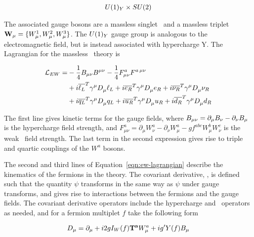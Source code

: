 \begin{align}
U(1)_{Y} \times SU(2) 
\end{align}

The associated gauge bosons are a massless singlet \Bmu\ and a massless triplet
$\mathbf{W_{\mu}} = \{W^{1}_{\mu}, W^{2}_{\mu}, W^{3}_{\mu}\}$. The $U(1)_{Y}$ gauge group is analogous to the
electromagnetic field, but is instead associated with hypercharge Y.
The Lagrangian for the massless \ew\ theory is

\begin{align}
\mathcal{L}_{EW}  = & - \frac{1}{4} B_{\mu\nu} B^{\mu\nu} - \frac{1}{4} F^{a}_{\mu\nu}
F^{a\,\mu\nu} \notag \\
& +  i \overline{\ell_{L}}^{T} \gamma^{\mu} D_{\mu}^{} \ell_{L} + i  \overline{e_{R}}^{T} \gamma^{\mu}
D_{\mu}^{} e_{R} + i \overline{\nu_{R}}^{T} \gamma^{\mu} D_{\mu}^{} \nu_{R} \notag \\
& +  i \overline{q_{L}}^{T} \gamma^{\mu} D_{\mu}^{} q_{L} + i  \overline{u_R}^{T} \gamma^{\mu}
D_{\mu}^{} u_R + i \overline{d_R}^{T} \gamma^{\mu} D_{\mu}^{} d_{R} 
\label{eqn:ew-lagrangian}
\end{align}

The first line gives kinetic terms for the gauge fields, where $ B_{\mu\nu} =
\partial_{\mu} B_{\nu} - \partial_{\nu} B_{\mu}$ is the hypercharge field strength,
and  $ F^{a}_{\mu\nu} =
\partial_{\mu} W^{a}_{\nu} - \partial_{\nu} W^{a}_{\mu} - g f^{abc} W^{b}_{\mu}
W^{c}_{\nu}$ is the weak \sutwo\ field strength. The last term in the second
expression gives rise to triple and quartic couplings of the $W^{a}$ bosons.

The second and third lines of Equation~\ref{eqn:ew-lagrangian} describe the
kinematics of the fermions in the theory. The covariant derivative, \Dmu, is
defined such that the quantity \Dmu$\psi$ transforms in the same way as $\psi$
under gauge transforms, and gives rise to interactions between the
fermions and the gauge fields. The covariant derivative operators include the
hypercharge and \sutwo\ operators as needed, and for a fermion multiplet $f$
take the following form

\begin{equation}
D_{\mu}  =  \partial_{\mu} + i2gI_{W}(f)\mathbf{T^{a}} W_{\mu}^{a} + ig'Y(f)B_{\mu}
\label{eqn:ew-covariant-derivative}
\end{equation}


